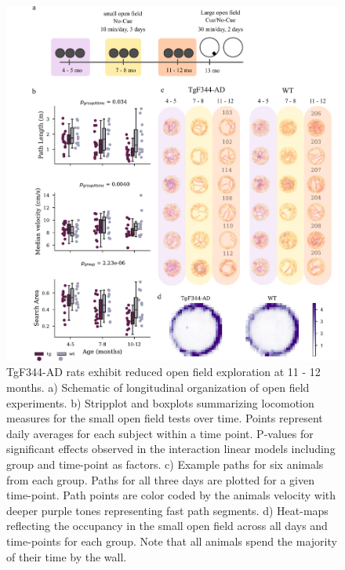 \documentclass[fleqn,10pt]{wlscirep}
\begin{document}
\begin{figure}
    \centering
    \includegraphics[width=1\textwidth]{notebooks/figs/Figure1.pdf}
    \caption{TgF344-AD rats exhibit reduced open field exploration at 11 - 12 months. a) Schematic of longitudinal organization of open field experiments. b) Stripplot and boxplots summarizing locomotion measures for the small open field tests over time. Points represent daily averages for each subject within a time point. P-values for significant effects observed in the interaction linear models including group and time-point as factors. c) Example paths for six animals from each group. Paths for all three days are plotted for a given time-point. Path points are color coded by the animals velocity with deeper purple tones representing fast path segments. d) Heat-maps reflecting the occupancy in the small open field across all days and time-points for each group. Note that all animals spend the majority of their time by the wall.}
    \label{locomotor_fig}
\end{figure}
\end{document}
